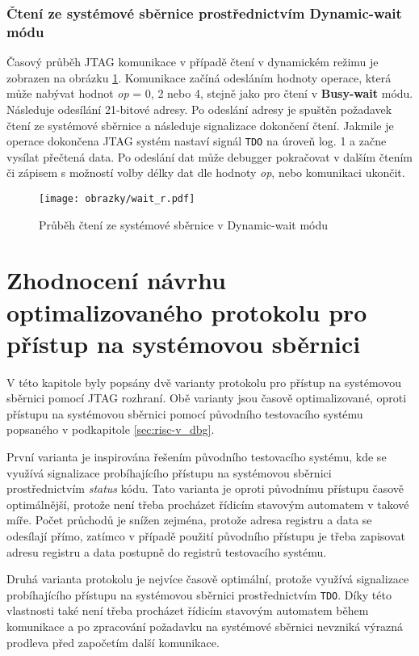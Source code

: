 \subsubsection{Čtení ze systémové sběrnice prostřednictvím Dynamic-wait módu}
Časový průběh JTAG komunikace v případě čtení v dynamickém režimu je zobrazen na obrázku \ref{fig:wait_r}. Komunikace začíná odesláním hodnoty operace, která může nabývat hodnot \textit{op} = 0, 2 nebo 4, stejně jako pro čtení v \textbf{Busy-wait} módu. Následuje odesílání 21-bitové adresy. Po odeslání adresy je spuštěn požadavek čtení ze systémové sběrnice a následuje signalizace dokončení čtení. Jakmile je operace dokončena \acs{JTAG} systém nastaví signál \texttt{\acs{TDO}} na úroveň log. 1 a začne vysílat přečtená data. Po odeslání dat může debugger pokračovat v dalším čtením či zápisem s možností volby délky dat dle hodnoty \textit{op}, nebo komunikaci ukončit. 

\begin{figure}[!h]
  \begin{center}
    \texttt{[image: obrazky/wait\_r.pdf]}
  \end{center}
  \caption{Průběh čtení ze systémové sběrnice v Dynamic-wait módu}
	\label{fig:wait_r}
\end{figure}

\section{Zhodnocení návrhu optimalizovaného protokolu pro přístup na systémovou sběrnici}
V této kapitole byly popsány dvě varianty protokolu pro přístup na systémovou sběrnici pomocí \acs{JTAG} rozhraní. Obě varianty jsou časově optimalizované, oproti přístupu na systémovou sběrnici pomocí původního testovacího systému popsaného v podkapitole \ref{sec:risc-v_dbg}.

První varianta je inspirována řešením původního testovacího systému, kde se využívá signalizace probíhajícího přístupu na systémovou sběrnici prostřednictvím \textit{status} kódu. Tato varianta je oproti původnímu přístupu časově optimálnější, protože není třeba procházet řídicím stavovým automatem v takové míře. Počet průchodů je snížen zejména, protože adresa registru a data se odesílají přímo, zatímco v případě použití původního přístupu je třeba zapisovat adresu registru a data postupně do registrů testovacího systému.

Druhá varianta protokolu je nejvíce časově optimální, protože využívá signalizace probíhajícího přístupu na systémovou sběrnici prostřednictvím \texttt{\acs{TDO}}. Díky této vlastnosti také není třeba procházet řídicím stavovým automatem během komunikace a po zpracování požadavku na systémové sběrnici nevzniká výrazná prodleva před započetím další komunikace.

